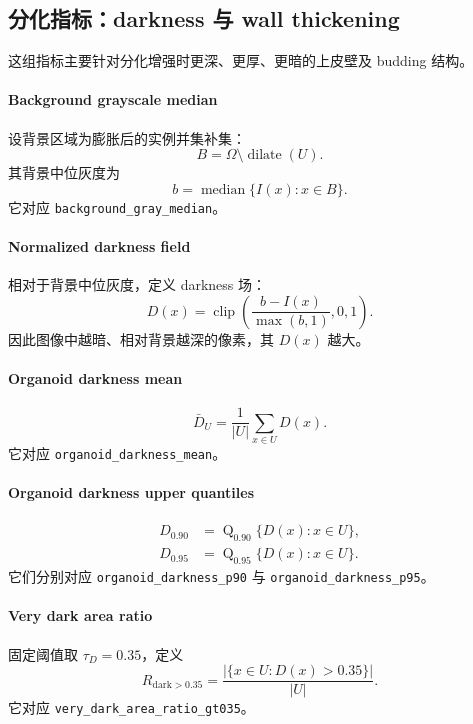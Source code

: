\documentclass[11pt]{article}
\newcommand{\1}{\mathbf{1}}
\newcommand{\clip}{\operatorname{clip}}
\newcommand{\med}{\operatorname{median}}
\newcommand{\quantile}{\operatorname{Q}}
\newcommand{\dilate}{\operatorname{dilate}}
\newcommand{\unionmask}{U}
\newcommand{\gray}{I}
\begin{document}
\subsection{分化指标：darkness 与 wall thickening}
这组指标主要针对分化增强时更深、更厚、更暗的上皮壁及 budding 结构。

\paragraph{Background grayscale median}
设背景区域为膨胀后的实例并集补集：
\begin{equation}
B = \Omega \setminus \dilate(\unionmask).
\end{equation}
其背景中位灰度为
\begin{equation}
b = \med\{\gray(x): x\in B\}.
\end{equation}
它对应 \texttt{background\_gray\_median}。

\paragraph{Normalized darkness field}
相对于背景中位灰度，定义 darkness 场：
\begin{equation}
D(x) = \clip\left(\frac{b-\gray(x)}{\max(b,1)}, 0, 1\right).
\end{equation}
因此图像中越暗、相对背景越深的像素，其 $D(x)$ 越大。

\paragraph{Organoid darkness mean}
\begin{equation}
\bar{D}_{\unionmask} = \frac{1}{|\unionmask|}\sum_{x\in\unionmask} D(x).
\end{equation}
它对应 \texttt{organoid\_darkness\_mean}。

\paragraph{Organoid darkness upper quantiles}
\begin{align}
D_{0.90} &= \quantile_{0.90}\{D(x):x\in\unionmask\},\\
D_{0.95} &= \quantile_{0.95}\{D(x):x\in\unionmask\}.
\end{align}
它们分别对应 \texttt{organoid\_darkness\_p90} 与 \texttt{organoid\_darkness\_p95}。

\paragraph{Very dark area ratio}
固定阈值取 $\tau_D=0.35$，定义
\begin{equation}
R_{\mathrm{dark}>0.35} = \frac{|\{x\in\unionmask : D(x) > 0.35\}|}{|\unionmask|}.
\end{equation}
它对应 \texttt{very\_dark\_area\_ratio\_gt035}。
\end{document}
